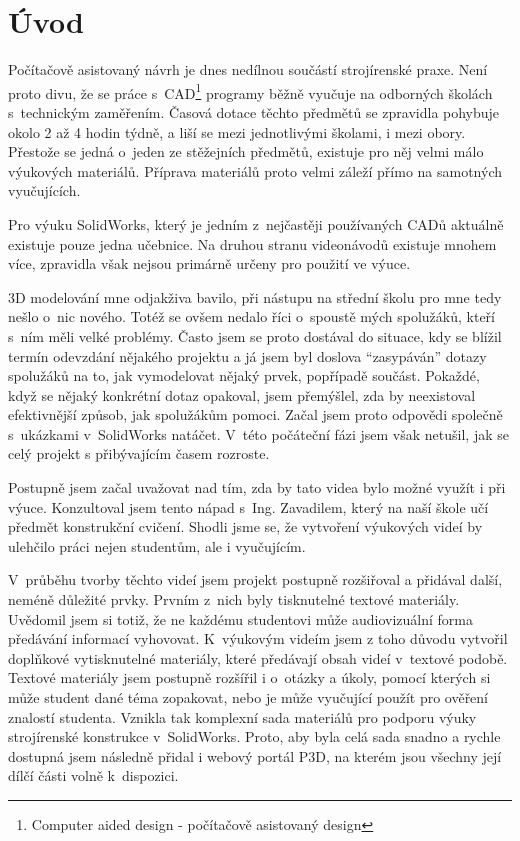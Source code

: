 \chapter*{Úvod}
Počítačově asistovaný návrh je dnes nedílnou součástí strojírenské praxe.
Není proto divu, že se práce s~CAD\footnote{Computer aided design - počítačově asistovaný design} programy běžně vyučuje na odborných školách s~technickým zaměřením.
Časová dotace těchto předmětů se zpravidla pohybuje okolo 2 až 4 hodin týdně, a liší se mezi jednotlivými školami, i mezi obory.
Přestože se jedná o~jeden ze stěžejních předmětů, existuje pro něj velmi málo výukových materiálů.
Příprava materiálů proto velmi záleží přímo na samotných vyučujících.

Pro výuku SolidWorks\cite{SOLIDWORKS}, který je jedním z~nejčastěji používaných CADů aktuálně existuje pouze jedna učebnice.
Na druhou stranu videonávodů existuje mnohem více, zpravidla však nejsou primárně určeny pro použití ve výuce.

3D modelování mne odjakživa bavilo, při nástupu na střední školu pro mne tedy nešlo o~nic nového.
Totéž se ovšem nedalo říci o~spoustě mých spolužáků, kteří s~ním měli velké problémy.
Často jsem se proto dostával do situace, kdy se blížil termín odevzdání nějakého projektu a já jsem byl doslova \enquote{zasypáván} dotazy spolužáků na to, jak vymodelovat nějaký prvek, popřípadě součást.
Pokaždé, když se nějaký konkrétní dotaz opakoval, jsem přemýšlel, zda by neexistoval efektivnější způsob, jak spolužákům pomoci.
Začal jsem proto odpovědi společně s~ukázkami v~SolidWorks natáčet.
V~této počáteční fázi jsem však netušil, jak se celý projekt s přibývajícím časem rozroste.

Postupně jsem začal uvažovat nad tím, zda by tato videa bylo možné využít i při výuce.
Konzultoval jsem tento nápad s~Ing. Zavadilem, který na naší škole učí předmět konstrukční cvičení.
Shodli jsme se, že vytvoření výukových videí by ulehčilo práci nejen studentům, ale i vyučujícím.

V~průběhu tvorby těchto videí jsem projekt postupně rozšiřoval a přidával další, neméně důležité prvky.
Prvním z~nich byly tisknutelné textové materiály.
Uvědomil jsem si totiž, že ne každému studentovi může audiovizuální forma předávání informací vyhovovat.
K~výukovým videím jsem z toho důvodu vytvořil doplňkové vytisknutelné materiály, které předávají obsah videí v~textové podobě.
Textové materiály jsem postupně rozšířil i o~otázky a úkoly, pomocí kterých si může student dané téma zopakovat, nebo je může vyučující použít pro ověření znalostí studenta.
Vznikla tak komplexní sada materiálů pro podporu výuky strojírenské konstrukce v~SolidWorks.
Proto, aby byla celá sada snadno a rychle dostupná jsem následně přidal i webový portál P3D, na kterém jsou všechny její dílčí části volně k~dispozici.

